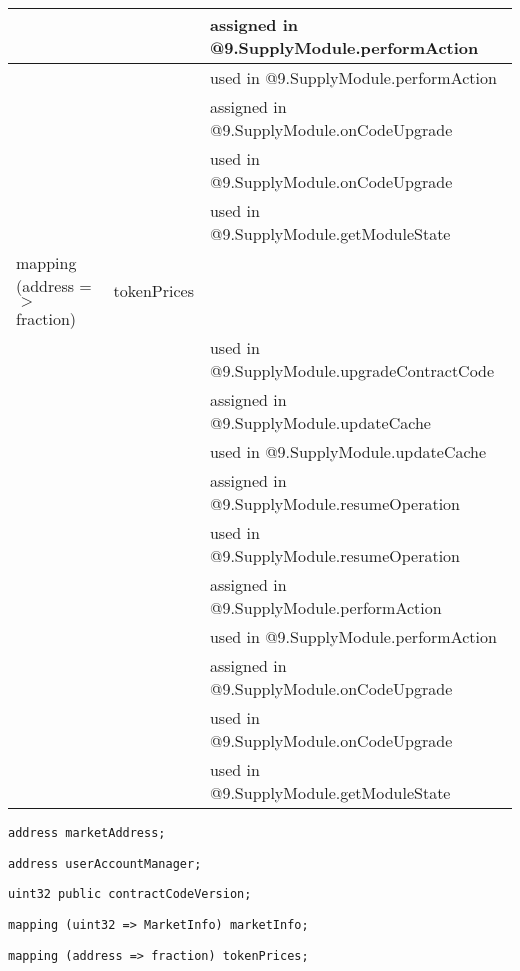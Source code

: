 \begin{tabular}{|l|l|p{5cm}|}
 & & assigned in @9.SupplyModule.performAction\\\hline
 & & used in @9.SupplyModule.performAction\\\hline
 & & assigned in @9.SupplyModule.onCodeUpgrade\\\hline
 & & used in @9.SupplyModule.onCodeUpgrade\\\hline
 & & used in @9.SupplyModule.getModuleState\\\hline
mapping (address =$>$ fraction) & tokenPrices &  \\\hline
 & & used in @9.SupplyModule.upgradeContractCode\\\hline
 & & assigned in @9.SupplyModule.updateCache\\\hline
 & & used in @9.SupplyModule.updateCache\\\hline
 & & assigned in @9.SupplyModule.resumeOperation\\\hline
 & & used in @9.SupplyModule.resumeOperation\\\hline
 & & assigned in @9.SupplyModule.performAction\\\hline
 & & used in @9.SupplyModule.performAction\\\hline
 & & assigned in @9.SupplyModule.onCodeUpgrade\\\hline
 & & used in @9.SupplyModule.onCodeUpgrade\\\hline
 & & used in @9.SupplyModule.getModuleState\\\hline
\end{tabular}
\fi


\begin{lstlisting}[firstnumber=12]
    address marketAddress;
\end{lstlisting}

\begin{lstlisting}[firstnumber=13]
    address userAccountManager;
\end{lstlisting}

\begin{lstlisting}[firstnumber=14]
    uint32 public contractCodeVersion;
\end{lstlisting}

\begin{lstlisting}[firstnumber=16]
    mapping (uint32 => MarketInfo) marketInfo;
\end{lstlisting}

\begin{lstlisting}[firstnumber=17]
    mapping (address => fraction) tokenPrices;
\end{lstlisting}

